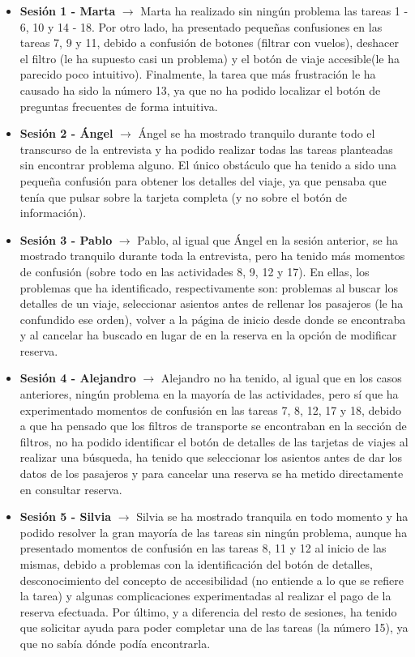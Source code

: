 \begin{itemize}
    \item \textbf{Sesión 1 - Marta} $\rightarrow$ Marta ha realizado sin ningún problema las tareas 1 - 6, 10 y 14 - 18. Por otro lado, ha presentado
    pequeñas confusiones en las tareas 7, 9 y 11, debido a confusión de botones (filtrar con vuelos), deshacer el filtro (le ha supuesto casi un problema)
    y el botón de viaje accesible(le ha parecido poco intuitivo). Finalmente, la tarea que más frustración le ha causado ha sido la número 13, ya que no 
    ha podido localizar el botón de preguntas frecuentes de forma intuitiva.
    \item \textbf{Sesión 2 - Ángel} $\rightarrow$ Ángel se ha mostrado tranquilo durante todo el transcurso de la entrevista y ha podido realizar todas las
    tareas planteadas sin encontrar problema alguno. El único obstáculo que ha tenido a sido una pequeña confusión para obtener los detalles del viaje, ya que
    pensaba que tenía que pulsar sobre la tarjeta completa (y no sobre el botón de información).
    \item \textbf{Sesión 3 - Pablo} $\rightarrow$ Pablo, al igual que Ángel en la sesión anterior, se ha mostrado tranquilo durante toda la entrevista, pero ha tenido
    más momentos de confusión (sobre todo en las actividades 8, 9, 12 y 17). En ellas, los problemas que ha identificado, respectivamente son: problemas al buscar los 
    detalles de un viaje, seleccionar asientos antes de rellenar los pasajeros (le ha confundido ese orden), volver a la página de inicio desde donde se encontraba y
    al cancelar ha buscado en lugar de en la reserva en la opción de modificar reserva.
    \item \textbf{Sesión 4 - Alejandro} $\rightarrow$ Alejandro no ha tenido, al igual que en los casos anteriores, ningún problema en la mayoría de las actividades, pero
    sí que ha experimentado momentos de confusión en las tareas 7, 8, 12, 17 y 18, debido a que ha pensado que los filtros de transporte se encontraban en la sección de filtros,
    no ha podido identificar el botón de detalles de las tarjetas de viajes al realizar una búsqueda, ha tenido que seleccionar los asientos antes de dar los datos de los
    pasajeros y para cancelar una reserva se ha metido directamente en consultar reserva.
    \item \textbf{Sesión 5 - Silvia} $\rightarrow$ Silvia se ha mostrado tranquila en todo momento y ha podido resolver la gran mayoría de las tareas sin ningún problema,
    aunque ha presentado momentos de confusión en las tareas 8, 11 y 12 al inicio de las mismas, debido a problemas con la identificación del botón de detalles, desconocimiento del
    concepto de accesibilidad (no entiende a lo que se refiere la tarea) y algunas complicaciones experimentadas al realizar el pago de la reserva efectuada. Por último, y a 
    diferencia del resto de sesiones, ha tenido que solicitar ayuda para poder completar una de las tareas (la número 15), ya que no sabía dónde podía encontrarla.
\end{itemize}

